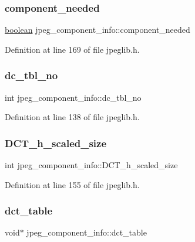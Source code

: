 \subsubsection{\texorpdfstring{component\_needed}{component\_needed}}
{\footnotesize\ttfamily \mbox{\hyperlink{jmorecfg_8h_a7c6368b321bd9acd0149b030bb8275ed}{boolean}} jpeg\+\_\+component\+\_\+info\+::component\+\_\+needed}



Definition at line 169 of file jpeglib.\+h.

\mbox{\label{structjpeg__component__info_a304fa583caa0601abc7077a218988854}} 
\subsubsection{\texorpdfstring{dc\_tbl\_no}{dc\_tbl\_no}}
{\footnotesize\ttfamily int jpeg\+\_\+component\+\_\+info\+::dc\+\_\+tbl\+\_\+no}



Definition at line 138 of file jpeglib.\+h.

\mbox{\label{structjpeg__component__info_a54dc0e1df56d88d3257fef0abfd9fea0}} 
\subsubsection{\texorpdfstring{DCT\_h\_scaled\_size}{DCT\_h\_scaled\_size}}
{\footnotesize\ttfamily int jpeg\+\_\+component\+\_\+info\+::\+D\+C\+T\+\_\+h\+\_\+scaled\+\_\+size}



Definition at line 155 of file jpeglib.\+h.

\mbox{\label{structjpeg__component__info_a9f68a39fc17561866668c1b9d4a8f238}} 
\subsubsection{\texorpdfstring{dct\_table}{dct\_table}}
{\footnotesize\ttfamily void$\ast$ jpeg\+\_\+component\+\_\+info\+::dct\+\_\+table}



